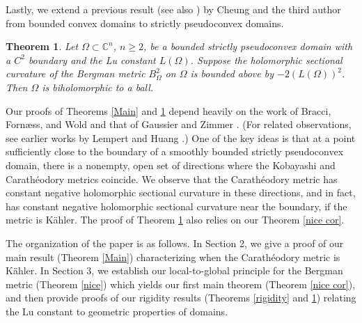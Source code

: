 \documentclass[12pt] {article}
\newtheorem{theorem}{Theorem}[section]
\numberwithin{equation}{section}
\begin{document}
 \medskip
    


  
 

     


\medskip




  



Lastly, we extend a previous result \cite{CW}  (see also \cite{CW00}) by Cheung and the third author from bounded convex domains  to 
strictly pseudoconvex domains.

 

\medskip

\begin{theorem} \label{2nd}
Let $\Omega \subset \mathbb{C}^n$, $n \geq 2$, be a bounded strictly pseudoconvex domain with a $C^2$ boundary and the Lu constant $L(\Omega)$. Suppose the holomorphic sectional curvature of the Bergman metric $B^2_{\Omega}$ on $\Omega$ is bounded above by $-2(L(\Omega))^2$. Then $\Omega$ is biholomorphic to a ball.
\end{theorem}



      \medskip

Our proofs of Theorems \ref{Main} and \ref{2nd} depend heavily on  the work of Bracci, Forn{\ae}ss, and Wold \cite{BFW19} and that of Gaussier and Zimmer  \cite{GZ}. (For related observations, see earlier works by Lempert \cite{Lem84} and Huang \cite{H94}.) One of the key ideas is that at a point sufficiently close to the boundary of a smoothly bounded strictly pseudoconvex domain, there is a nonempty, open set of directions where the Kobayashi and Carath\'eodory metrics coincide. We observe that the Carath\'eodory metric has constant negative holomorphic sectional curvature in these directions, and in fact, has constant negative holomorphic sectional curvature near the boundary, if the metric is 
K\"ahler. The proof of Theorem  \ref{2nd} also relies on our  Theorem \ref{nice cor}.

\medskip

 

The organization of the paper is as follows. In Section 2, we give a proof of our main result (Theorem \ref{Main}) characterizing when the Carath\'eodory metric is K\"ahler. 
In Section 3, we establish our 
local-to-global principle for the Bergman metric (Theorem \ref{nice}) which yields our first main theorem (Theorem \ref{nice cor}), and then provide proofs of our rigidity results (Theorems \ref{rigidity} and \ref{2nd}) relating the Lu constant to geometric properties of domains.
\end{document}
